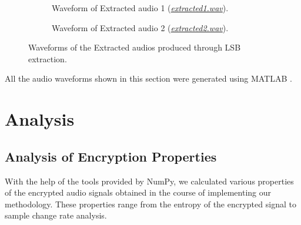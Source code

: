 \documentclass[a4paper]{cas-sc}
\begin{document}
\begin{figure}[pos=h]
    \begin{subfigure}[h]{0.45\textwidth}
        \begin{center}
            
            \caption{Waveform of Extracted audio 1 (\href{https://drive.google.com/file/d/12_0keSBukOVs4bYei2KcD-kNjAPxFFdQ/view?usp=drive_link}{\textit{extracted1.wav}}).}
            \label{fig:extracted1}
        \end{center}
    \end{subfigure}
    \hfill
    \begin{subfigure}[h]{0.45\textwidth}
        \begin{center}
            
            \caption{Waveform of Extracted audio 2 (\href{https://drive.google.com/file/d/1Ikted9eaGw5HmMriXayIZHRsX-7acT6Z/view?usp=drive_link}{\textit{extracted2.wav}}).}
            \label{fig:extracted2}
        \end{center}
    \end{subfigure}
    \caption{Waveforms of the Extracted audios produced through LSB extraction.}
\end{figure}

All the audio waveforms shown in this section were generated using MATLAB \cite{MATLAB:R2016a}.
\section{Analysis}
\label{sec:analysis}
\subsection{Analysis of Encryption Properties}
With the help of the tools provided by NumPy, we calculated various properties of the encrypted audio signals obtained in the course of implementing our methodology. These properties range from the entropy of the encrypted signal to sample change rate analysis.
\end{document}
